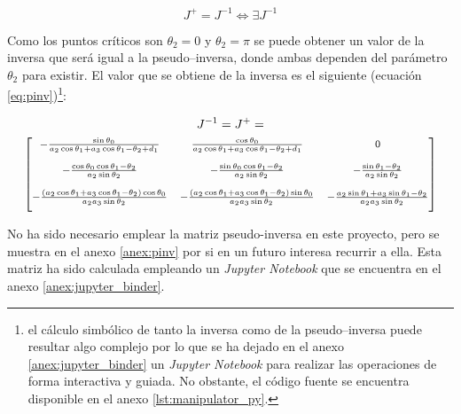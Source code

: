 \begin{equation*}
    J^+ = J^{-1} \iff \exists J^{-1}
\end{equation*}

Como los puntos críticos son $\theta_2 = 0$ y $\theta_2 = \pi$ se puede obtener un valor
de la inversa que será igual a la pseudo--inversa, donde ambas dependen del parámetro
$\theta_2$ para existir. El valor que se obtiene de la inversa es el siguiente (ecuación
\ref{eq:pinv})\footnote{el cálculo simbólico de tanto la inversa como de la pseudo--inversa
    puede resultar algo complejo por lo que se ha dejado en el anexo \ref{anex:jupyter_binder}
    un \textit{Jupyter Notebook} para realizar las operaciones de forma interactiva y guiada.
    No obstante, el código fuente se encuentra disponible en el anexo \ref{lst:manipulator_py}.}:

\begin{gather}\label{eq:pinv}
    J^{-1} = J^+ = \\
    {\footnotesize\begin{bmatrix}
        - \frac{\sin{\theta_{0}}}{a_{2} \cos{\theta_{1}} + a_{3} \cos{\theta_{1} - \theta_{2}} + d_{1}}                                   & \frac{\cos{\theta_{0}}}{a_{2} \cos{\theta_{1}} + a_{3} \cos{\theta_{1} - \theta_{2}} + d_{1}}                                     & 0                                                                                                   \\[3ex]
        - \frac{\cos{\theta_{0}} \cos{\theta_{1} - \theta_{2}}}{a_{2} \sin{\theta_{2}}}                                                   & - \frac{\sin{\theta_{0}} \cos{\theta_{1} - \theta_{2}}}{a_{2} \sin{\theta_{2}}}                                                   & - \frac{\sin{\theta_{1} - \theta_{2}}}{a_{2} \sin{\theta_{2}}}                                      \\[3ex]
        - \frac{\left(a_{2} \cos{\theta_{1}} + a_{3} \cos{\theta_{1} - \theta_{2}}\right) \cos{\theta_{0}}}{a_{2} a_{3} \sin{\theta_{2}}} & - \frac{\left(a_{2} \cos{\theta_{1}} + a_{3} \cos{\theta_{1} - \theta_{2}}\right) \sin{\theta_{0}}}{a_{2} a_{3} \sin{\theta_{2}}} & - \frac{a_{2} \sin{\theta_{1}} + a_{3} \sin{\theta_{1} - \theta_{2}}}{a_{2} a_{3} \sin{\theta_{2}}} \\[2ex]
    \end{bmatrix}} \nonumber
\end{gather}

No ha sido necesario emplear la matriz pseudo-inversa en este proyecto, pero se muestra en el anexo \ref{anex:pinv} por si en un futuro interesa recurrir a ella.
Esta matriz ha sido calculada empleando un
\textit{Jupyter Notebook} que se encuentra en el anexo
\ref{anex:jupyter_binder}.